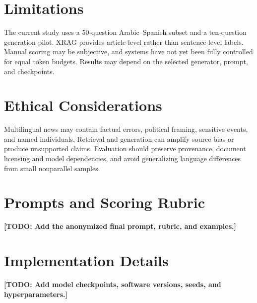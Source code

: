 \documentclass[11pt]{article}
\begin{document}
\section*{Limitations}
The current study uses a 50-question Arabic--Spanish subset and a ten-question generation pilot. XRAG provides article-level rather than sentence-level labels. Manual scoring may be subjective, and systems have not yet been fully controlled for equal token budgets. Results may depend on the selected generator, prompt, and checkpoints.

\section*{Ethical Considerations}
Multilingual news may contain factual errors, political framing, sensitive events, and named individuals. Retrieval and generation can amplify source bias or produce unsupported claims. Evaluation should preserve provenance, document licensing and model dependencies, and avoid generalizing language differences from small nonparallel samples.


\appendix
\section{Prompts and Scoring Rubric}
\textbf{[TODO: Add the anonymized final prompt, rubric, and examples.]}
\section{Implementation Details}
\textbf{[TODO: Add model checkpoints, software versions, seeds, and hyperparameters.]}
\end{document}
